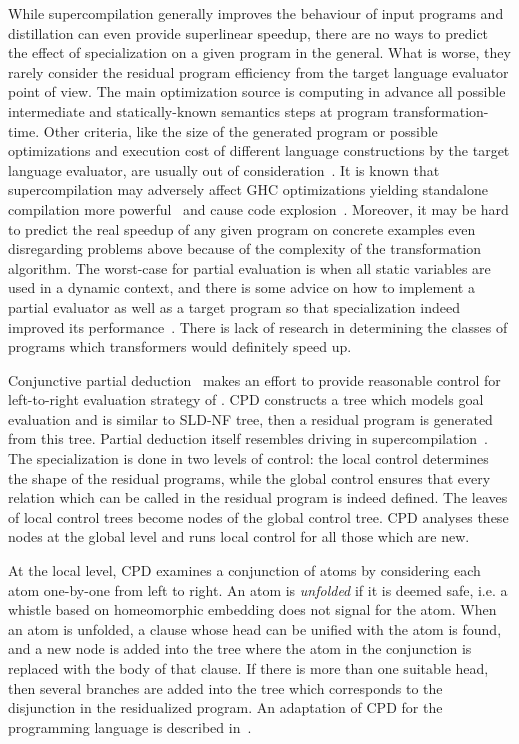 While supercompilation generally improves the behaviour of input programs and distillation can even provide superlinear speedup, there are no ways to predict the effect of specialization on a given program in the general.
What is worse, they rarely consider the residual program efficiency from the target language evaluator point of view.
The main optimization source is computing in advance all possible intermediate and statically-known semantics steps at program transformation-time.
Other criteria, like the size of the generated program or possible optimizations and execution cost of different language constructions by the target language evaluator, are usually out of consideration~\cite{jonesbook}.
It is known that supercompilation may adversely affect GHC optimizations yielding standalone compilation more powerful~\cite{SCBE,TCES} and cause code explosion~\cite{SCHC}.
Moreover, it may be hard to predict the real speedup of any given program on concrete examples even disregarding problems above because of the complexity of the transformation algorithm.
The worst-case for partial evaluation is when all static variables are used in a dynamic context, and there is some advice on how to implement a partial evaluator as well as a target program so that specialization indeed improved its performance~\cite{jonesbook,bulyonkov84}.
There is lack of research in determining the classes of programs which transformers would definitely speed up.

Conjunctive partial deduction~\cite{de1999conjunctive} makes an effort to provide reasonable control for left-to-right evaluation strategy of \pro.
CPD constructs a tree which models goal evaluation and is similar to SLD-NF tree, then a residual program is generated from this tree.
Partial deduction itself resembles driving in supercompilation~\cite{gluck1994partial}.
The specialization is done in two levels of control: the local control determines the shape of the residual programs, while the global control ensures that every relation which can be called in the residual program is indeed defined.
The leaves of local control trees become nodes of the global control tree.
CPD analyses these nodes at the global level and runs local control for all those which are new.

At the local level, CPD examines a conjunction of atoms by considering each atom one-by-one from left to right.
An atom is \emph{unfolded} if it is deemed safe, i.e. a whistle based on homeomorphic embedding does not signal for the atom.
When an atom is unfolded, a clause whose head can be unified with the atom is found, and a new node is added into the tree where the atom in the conjunction is replaced with the body of that clause.
If there is more than one suitable head, then several branches are added into the tree which corresponds to the disjunction in the residualized program.
An adaptation of CPD for the \mk programming language is described in~\cite{lozov2019relational}.

